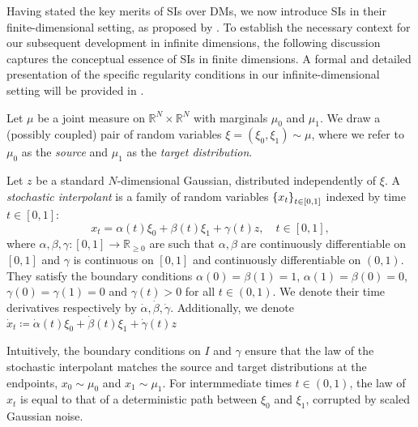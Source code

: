 Having stated the key merits of SIs over DMs, we now introduce SIs in their finite-dimensional setting, as proposed by \citet{albergo2023stochasticinterpolantsunifyingframework,albergo2023stochastic}. To establish the necessary context for our subsequent development in infinite dimensions, the following discussion captures the conceptual essence of SIs in finite dimensions. A formal and detailed presentation of the specific regularity conditions in our infinite-dimensional setting will be provided in .

Let \(\mu\) be a joint measure on \(\mathbb{R}^{N} \times \mathbb{R}^{N}\) with marginals \(\mu_{0}\) and \(\mu_{1}\). We draw a (possibly coupled) pair of random variables \(\xi = (\xi_{0}, \xi_{1}) \sim \mu\), where we refer to \(\mu_{0}\) as the \textit{source} and \(\mu_{1}\) as the \textit{target distribution}.



Let \(z\) be a standard \(N\)-dimensional Gaussian, distributed independently of \(\xi\). A \textit{stochastic interpolant} is a family of random variables \(\qty{x_{t}}_{t \in [0, 1]}\) indexed by time \(t \in [0, 1]\):
\[
  x_{t} = \alpha(t) \xi_{0} + \beta(t) \xi_{1} + \gamma(t)z, \quad t \in [0, 1],
\]
where \(\alpha, \beta, \gamma : [0, 1] \to \mathbb{R}_{\geq 0}\) are such that \(\alpha, \beta\) are  continuously differentiable on \([0, 1]\) and \(\gamma\) is continuous on \([0, 1]\) and continuously differentiable on \((0, 1)\). They satisfy the boundary conditions \(\alpha(0) =  \beta(1) = 1\), \(\alpha(1) = \beta(0) = 0\), \(\gamma(0) = \gamma(1) = 0\) and \(\gamma(t) > 0\) for all \(t \in (0, 1)\). We denote their time derivatives respectively by \(\dot{\alpha}, \dot{\beta}, \dot{\gamma}\). Additionally, we denote \(\dot{x}_{t} \coloneqq \dot{\alpha}(t)\xi_{0} + \dot{\beta}(t) \xi_{1} + \dot{\gamma}(t) z\)

Intuitively, the boundary conditions on \(I\) and \(\gamma\) ensure that the law of the stochastic interpolant matches the source and target distributions at the endpoints, \(x_{0} \sim \mu_{0}\) and \(x_{1} \sim \mu_{1}\). For intermmediate times \(t \in (0, 1)\), the law of \(x_{t}\) is equal to that of a deterministic path between \(\xi_{0}\) and \(\xi_{1}\), corrupted by scaled Gaussian noise.

